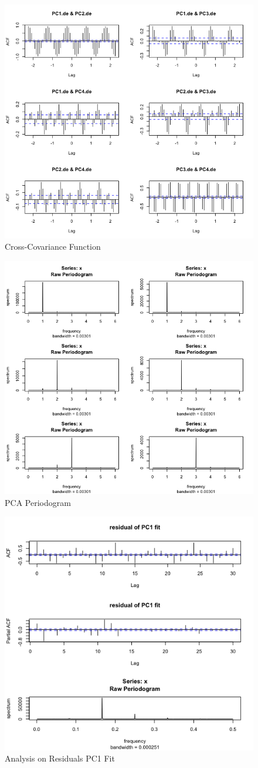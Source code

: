 \documentclass[11pt]{article}
\begin{document}
\begin{figure}
	\centering
	\includegraphics[width=0.7\linewidth]{../img/PCAde_CCF}
	\caption{Cross-Covariance Function}
	\label{fig:pcadpeccf}
\end{figure}

\begin{figure}
	\centering
	\includegraphics[width=0.7\linewidth]{../img/PCA_periodogram}
	\caption{PCA Periodogram}
	\label{fig:pcaperiodogram}
\end{figure}

\begin{figure}
	\centering
	\includegraphics[width=0.7\linewidth]{../img/residualpc1}
	\caption{Analysis on Residuals PC1 Fit}
	\label{fig:residualpc1}
\end{figure}
\end{document}
